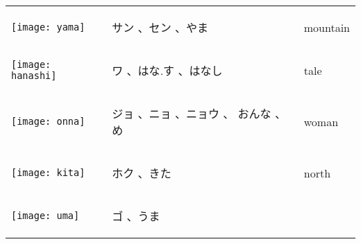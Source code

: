 \documentclass[a4paper,12pt]{extarticle}
\begin{document}
\begin{longtable}{|lp{6cm}p{4cm}|}
\begin{minipage}{0.3\textwidth}
		\centerline{
			\texttt{[image: yama]}
		}
	\end{minipage}
	                                   &
	\begin{CJK}{UTF8}{min} サン 、セン 、やま\end{CJK}
	                                   &
	mountain
	\\
	\begin{minipage}{0.3\textwidth}
		\centerline{
			\texttt{[image: hanashi]}
		}
	\end{minipage}
	                                   &
	\begin{CJK}{UTF8}{min} ワ 、はな.す 、はなし\end{CJK}
	                                   &
	tale
	\\
	\begin{minipage}{0.3\textwidth}
		\centerline{
			\texttt{[image: onna]}
		}
	\end{minipage}
	                                   &
	\begin{CJK}{UTF8}{min} ジョ 、ニョ 、ニョウ 、 おんな 、め\end{CJK}
	                                   &
	woman
	\\
	\begin{minipage}{0.3\textwidth}
		\centerline{
			\texttt{[image: kita]}
		}
	\end{minipage}
	                                   &
	\begin{CJK}{UTF8}{min} ホク 、きた\end{CJK}
	                                   &
	north
	\\
	\begin{minipage}{0.3\textwidth}
		\centerline{
			\texttt{[image: uma]}
		}
	\end{minipage}
	                                   &
	\begin{CJK}{UTF8}{min} ゴ 、うま\end{CJK}

\end{longtable}
\end{document}
